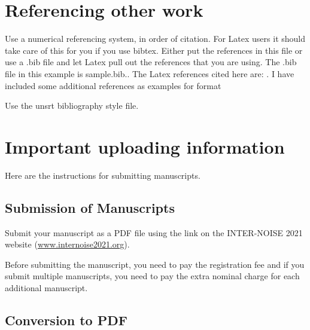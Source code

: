 \section{Referencing other work}

\noindent
Use a numerical referencing system, in order of citation.  For Latex users it should take care of this for you if you use bibtex.   Either put the references in this file or use a .bib file and let Latex pull out the references that you are using.  The .bib file in this example is sample.bib..  The Latex references cited here are:  \cite{latexcompanion, knuthwebsite}.  I have included some additional references as examples for format \cite{Poulsen1, Ryherd2007, Tang2006, May96,  Zwicker_Fastl_2006, ANSI_S3_4}

\vspace{\baselineskip}

Use the unsrt bibliography style file.  


\section{Important uploading information}

\noindent
Here are the instructions for submitting manuscripts. 

\subsection{Submission of Manuscripts}

\noindent
Submit your manuscript as a PDF file using the link on the INTER-NOISE 2021 website (\url{www.internoise2021.org}). 

Before submitting the manuscript, you need to pay the registration fee and if you submit multiple manuscripts, you need to pay the extra nominal charge for each additional manuscript.

\subsection{Conversion to PDF}

